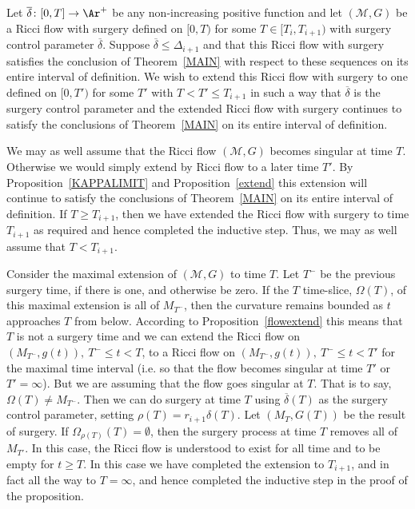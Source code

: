 Let $\overline \delta\colon [0,T]\to \Ar^+$ be any non-increasing positive
function and let $({\mathcal M},G)$ be a Ricci flow with surgery defined on
$[0,T)$ for some $T\in [T_i,T_{i+1})$ with surgery control parameter
$\overline\delta$. Suppose $\overline \delta\le \Delta_{i+1}$ and that this
Ricci flow with surgery satisfies the conclusion of Theorem~\ref{MAIN} with
respect to these sequences on its entire interval of definition. We wish to
extend this Ricci flow with surgery to one defined on $[0,T')$ for some $T'$
with $T<T'\le T_{i+1}$ in such a way that $\overline\delta$ is the surgery
control parameter and the extended Ricci flow with surgery continues to satisfy
the conclusions of Theorem~\ref{MAIN} on its entire interval of definition.

We may as well assume that the Ricci flow $({\mathcal M},G)$ becomes
singular at time $T$. Otherwise we would simply extend by Ricci flow
to a later time $T'$. By Proposition~\ref{KAPPALIMIT} and
Proposition~\ref{extend} this extension will continue to satisfy the
conclusions of Theorem~\ref{MAIN} on its entire interval of
definition. If $T\ge T_{i+1}$, then we have extended the Ricci flow
with surgery to time $T_{i+1}$ as required and hence completed the
inductive step. Thus, we may as well assume that $T<T_{i+1}$.

Consider the maximal extension of $({\mathcal M},G)$ to time $T$. Let $T^-$ be
the previous surgery time, if there is one, and otherwise be zero. If the $T$
time-slice, $\Omega(T)$, of this maximal extension is all of $M_{T^-}$, then
the curvature remains bounded as $t$ approaches $T$ from below. According to
Proposition~\ref{flowextend} this means that $T$ is not a surgery time and we
can extend the Ricci flow on $(M_{T^-},g(t)),\ T^-\le t<T$, to a Ricci flow on
$(M_{T^-},g(t)),\ T^-\le t<T'$ for the maximal time interval (i.e. so that the
flow becomes singular at time $T'$ or $T'=\infty$). But we are assuming that
the flow goes singular at  $T$. That is to say,  $\Omega(T)\not= M_{T^-}$. Then
we can do surgery at time $T$ using $\overline \delta(T)$ as the surgery
control parameter, setting $\rho(T)=r_{i+1}\delta(T)$. Let $(M_T,G(T))$ be the
result of surgery. If $\Omega_{\rho(T)}(T)=\emptyset$, then the surgery process
at time $T$ removes all of $M_{T'}$. In this case, the Ricci flow is understood
to exist for all time and to be empty for $t\ge T$. In this case we have
completed the extension to $T_{i+1}$, and in fact all the way to $T=\infty$,
and hence completed the inductive step in the proof of the proposition.

